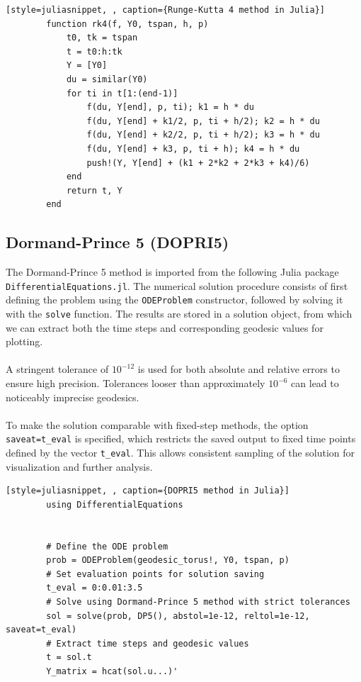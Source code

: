 \documentclass{article}
\begin{document}
	\begin{lstlisting}[style=juliasnippet, , caption={Runge-Kutta 4 method in Julia}]
		function rk4(f, Y0, tspan, h, p)
			t0, tk = tspan
			t = t0:h:tk
			Y = [Y0]
			du = similar(Y0)
			for ti in t[1:(end-1)]
				f(du, Y[end], p, ti); k1 = h * du
				f(du, Y[end] + k1/2, p, ti + h/2); k2 = h * du
				f(du, Y[end] + k2/2, p, ti + h/2); k3 = h * du
				f(du, Y[end] + k3, p, ti + h); k4 = h * du
				push!(Y, Y[end] + (k1 + 2*k2 + 2*k3 + k4)/6)
			end
			return t, Y
		end
	\end{lstlisting}

	
	\subsection{Dormand-Prince 5 (DOPRI5)}

	The Dormand-Prince 5 method is imported from the following Julia package \\ \texttt{DifferentialEquations.jl}. The numerical solution procedure consists of first defining the problem using the \texttt{ODEProblem} constructor, followed by solving it with the \texttt{solve} function. The results are stored in a solution object, from which we can extract both the time steps and corresponding geodesic values for plotting.\\\\

	
	A stringent tolerance of $10^{-12}$ is used for both absolute and relative errors to ensure high precision. Tolerances looser than approximately $10^{-6}$ can lead to noticeably imprecise geodesics.\\\\
	
	To make the solution comparable with fixed-step methods, the option \texttt{saveat=t\_eval} is specified, which restricts the saved output to fixed time points defined by the vector \texttt{t\_eval}. This allows consistent sampling of the solution for visualization and further analysis.
		\newpage
	\begin{lstlisting}[style=juliasnippet, , caption={DOPRI5 method in Julia}]
		using DifferentialEquations
		
		
		# Define the ODE problem
		prob = ODEProblem(geodesic_torus!, Y0, tspan, p)
		# Set evaluation points for solution saving
		t_eval = 0:0.01:3.5
		# Solve using Dormand-Prince 5 method with strict tolerances
		sol = solve(prob, DP5(), abstol=1e-12, reltol=1e-12, saveat=t_eval)	
		# Extract time steps and geodesic values
		t = sol.t
		Y_matrix = hcat(sol.u...)'
	\end{lstlisting}
	\newpage
\end{document}
